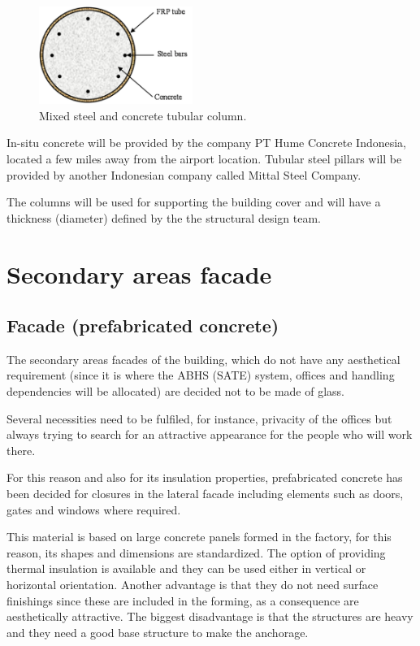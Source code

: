 		\begin{figure}[ht!]
\centering
\includegraphics[width=5cm]{./images/Facade/columns}
\caption{Mixed steel and concrete tubular column.}
\end{figure}

In-situ concrete will be provided by the company PT Hume Concrete Indonesia, located a few miles away from the airport location. Tubular steel pillars will be provided by another Indonesian company called Mittal Steel Company.

The columns will be used for supporting the building cover and will have a thickness (diameter) defined by the the structural design team.
	
	
	\section{Secondary areas facade}
		\subsection{Facade (prefabricated concrete)}
	The secondary areas facades of the building, which do not have any aesthetical requirement (since it is where the ABHS (SATE) system, offices and handling dependencies will be allocated) are decided not to be made of glass. 
	
	Several necessities need to be fulfiled, for instance, privacity of the offices but always trying to search for an attractive appearance for the people who will work there. 
	
	For this reason and also for its insulation properties, prefabricated concrete has been decided for closures in the lateral facade including elements such as doors, gates and windows where required.
	
	This material is based on large concrete panels formed in the factory, for this reason, its shapes and dimensions are standardized. The option of providing thermal insulation is available and they can be used either in vertical or horizontal orientation. Another advantage is that they do not need surface finishings since these are included in the forming, as a consequence are aesthetically attractive. The biggest disadvantage is that the structures are heavy and they need a good base structure to make the anchorage.
	
